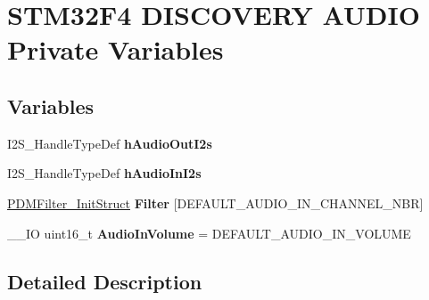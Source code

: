 \hypertarget{group___s_t_m32_f4___d_i_s_c_o_v_e_r_y___a_u_d_i_o___private___variables}{}\section{S\+T\+M32\+F4 D\+I\+S\+C\+O\+V\+E\+RY A\+U\+D\+IO Private Variables}
\label{group___s_t_m32_f4___d_i_s_c_o_v_e_r_y___a_u_d_i_o___private___variables}
\subsection*{Variables}
\begin{DoxyCompactItemize}
\item 
\mbox{\label{group___s_t_m32_f4___d_i_s_c_o_v_e_r_y___a_u_d_i_o___private___variables_ga9734e3359903aa5c2318ce34dd5ac3a2}} 
I2\+S\+\_\+\+Handle\+Type\+Def {\bfseries h\+Audio\+Out\+I2s}
\item 
\mbox{\label{group___s_t_m32_f4___d_i_s_c_o_v_e_r_y___a_u_d_i_o___private___variables_ga6747a14576e091de69a037af315fe89b}} 
I2\+S\+\_\+\+Handle\+Type\+Def {\bfseries h\+Audio\+In\+I2s}
\item 
\mbox{\label{group___s_t_m32_f4___d_i_s_c_o_v_e_r_y___a_u_d_i_o___private___variables_ga16be328289dcb65ae645fdb1988e89e3}} 
\mbox{\hyperlink{struct_p_d_m_filter___init_struct}{P\+D\+M\+Filter\+\_\+\+Init\+Struct}} {\bfseries Filter} \mbox{[}D\+E\+F\+A\+U\+L\+T\+\_\+\+A\+U\+D\+I\+O\+\_\+\+I\+N\+\_\+\+C\+H\+A\+N\+N\+E\+L\+\_\+\+N\+BR\mbox{]}
\item 
\mbox{\label{group___s_t_m32_f4___d_i_s_c_o_v_e_r_y___a_u_d_i_o___private___variables_gaa7ea32df300b1ecd063e28c21da56076}} 
\+\_\+\+\_\+\+IO uint16\+\_\+t {\bfseries Audio\+In\+Volume} = D\+E\+F\+A\+U\+L\+T\+\_\+\+A\+U\+D\+I\+O\+\_\+\+I\+N\+\_\+\+V\+O\+L\+U\+ME
\end{DoxyCompactItemize}


\subsection{Detailed Description}
